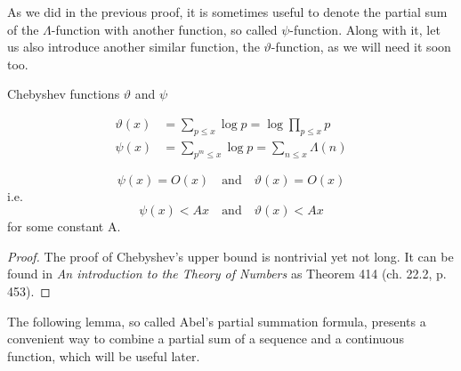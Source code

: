 \documentclass{article}
\begin{document}
As we did in the previous proof, it is sometimes useful to denote the partial sum of the $\Lambda$-function with another function, so called $\psi$-function. Along with it, let us also introduce another similar function, the $\vartheta$-function, as we will need it soon too.

\begin{definition}
Chebyshev functions $\vartheta$ and $\psi$

\begin{align*}
     \vartheta(x) & = \sum_{p\leq x} \log p = \log \prod_{p\leq x} p\\
    \psi(x) & = \sum_{p^m\leq x} \log p = \sum_{n\leq x} \Lambda(n)
\end{align*}
\end{definition}

\begin{lemma}
\label{lemma:cheb}
\begin{equation*}
    \psi(x) = O(x) \quad\text{and}\quad \vartheta(x)=O(x)
\end{equation*}
i.e.
\begin{equation*}
    \psi(x) < Ax \quad\text{and}\quad \vartheta(x) < Ax
\end{equation*}
for some constant A.
\begin{proof}
The proof of Chebyshev's upper bound is nontrivial yet not long. It can be found in \textit{An introduction to the Theory of Numbers} \cite{HardyWright} as Theorem 414 (ch. 22.2, p. 453).
\end{proof}
\end{lemma}

The following lemma, so called Abel's partial summation formula, presents a convenient way to combine a partial sum of a sequence and a continuous function, which will be useful later.
\end{document}
